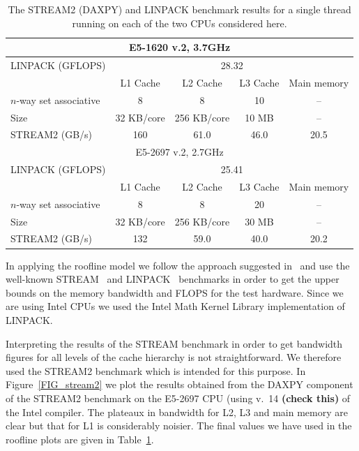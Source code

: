 \documentclass[12pt]{article}
\begin{document}
\begin{table}
\begin{tabular}{|l|c|c|c|c|}
\hline
  \multicolumn{5}{|c|}{E5-1620 v.2, 3.7GHz} \\
  \hline
LINPACK (GFLOPS) & \multicolumn{4}{c|}{28.32} \\
\hline
&  L1 Cache & L2 Cache & L3 Cache & Main memory \\
$n$-way set associative & 8    & 8   & 10 & -- \\
Size                  &   32 KB/core   & 256 KB/core   & 10 MB    &  -- \\
\hline
STREAM2 (GB/s)   &  160  &  61.0  & 46.0 &  20.5 \\
  \hline
\multicolumn{5}{|c|}{E5-2697 v.2, 2.7GHz}  \\
\hline
LINPACK (GFLOPS) & \multicolumn{4}{c|}{25.41} \\
\hline
               & L1 Cache & L2 Cache & L3 Cache & Main memory \\
$n$-way set associative & 8    & 8   & 20 & -- \\
Size           &   32 KB/core  & 256 KB/core   & 30 MB    &  -- \\
\hline
STREAM2 (GB/s) & 132      & 59.0     & 40.0     &  20.2 \\
\hline
\end{tabular}
\caption{The STREAM2 (DAXPY) and LINPACK benchmark results for a
  single thread running on each of the two CPUs considered here.}
\label{TAB_stream_linpack}
\end{table}

In applying the roofline model we follow the approach suggested
in~\cite{para_pearls} and use the well-known STREAM~\cite{stream} and
LINPACK~\cite{linpack} benchmarks in order to get the upper bounds on
the memory bandwidth and FLOPS for the test hardware. Since we are
using Intel CPUs we used the Intel Math Kernel Library implementation
of LINPACK.

Interpreting the results of the STREAM benchmark in order to get
bandwidth figures for all levels of the cache hierarchy is not
straightforward. We therefore used the STREAM2 benchmark which is
intended for this purpose. In Figure~\ref{FIG_stream2} we plot the
results obtained from the DAXPY component of the STREAM2 benchmark on
the E5-2697 CPU (using v.~14 {\bf (check this)} of the Intel
compiler. The plateaux in bandwidth for L2, L3 and main memory are
clear but that for L1 is considerably noisier. The final values we
have used in the roofline plots are given in
Table~\ref{TAB_stream_linpack}.
\end{document}
